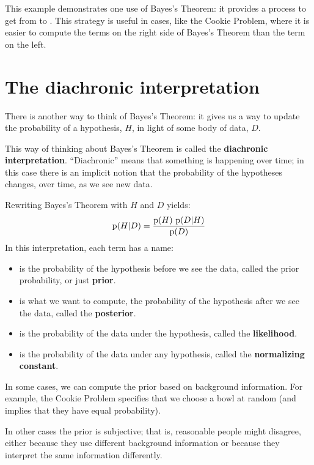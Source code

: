 \documentclass[12pt]{book}
\begin{document}
This example demonstrates one use of Bayes's Theorem: it provides
a process to get from  to .  This strategy is useful
in cases, like the Cookie Problem, where it is easier to compute
the terms on the right side of Bayes's Theorem than the term on the
left.

\section{The diachronic interpretation}

There is another way to think of Bayes's Theorem: it gives us a
way to update the probability of a hypothesis, $H$, in light of
some body of data, $D$.

This way of thinking about Bayes's Theorem is called the
{\bf diachronic interpretation}.  ``Diachronic'' means that something
is happening over time; in this case there is an implicit notion
that the probability of the hypotheses changes, over time, as
we see new data.

Rewriting Bayes's Theorem with $H$ and $D$ yields:
%
\[ \mathrm{p}(H|D) = \frac{\mathrm{p}(H)~\mathrm{p}(D|H)}{\mathrm{p}(D)} \]
%
In this interpretation, each term has a name:

\begin{itemize}

\item {} is the probability of the hypothesis before we see
the data, called the prior probability, or just {\bf prior}.

\item {} is what we want to compute, the probability of
the hypothesis after we see the data, called the {\bf posterior}.
 
\item {} is the probability of the data under the hypothesis,
called the {\bf likelihood}.

\item {} is the probability of the data under any hypothesis,
called the {\bf normalizing constant}.

\end{itemize}

In some cases, we can compute the prior
based on background information.  For example, the Cookie
Problem specifies that we choose a bowl at random (and implies
that they have equal probability).

In other cases the prior
is subjective; that is, reasonable people might disagree,
either because they use different background information
or because they interpret the same information differently.
\end{document}
